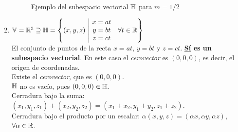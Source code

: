 \begin{enumerate}
\begin{figure}
        \caption{Ejemplo del subespacio vectorial $\mathbb{H}$ para $m=1/2$}
        \label{fig:ejemplo_de_subespacio_vectorial_1}
    \end{figure}

    \item $\mathbb{V} = \mathbb{R}^3 \supseteq \mathbb{H} = \left\{ (x,y,z) \ \middle| \ \begin{matrix} x = at \\ y = bt \\ z = ct \end{matrix} \quad \forall t \in \mathbb{R} \right\}$ \\ El conjunto de puntos de la recta $x = at$, $y = bt$ y $z = ct$. \textbf{\underline{Sí} es un subespacio vectorial}. En este caso el \textit{cerovector} es $(0, 0, 0)$, es decir, el origen de coordenadas.\\
        \checkmark Existe el \textit{cerovector}, que es $(0, 0, 0)$. \\
        \checkmark $\mathbb{H}$ no es vacío, pues $(0, 0, 0) \in \mathbb{H}$. \\
        \checkmark Cerradura bajo la suma: $(x_1, y_1, z_1) + (x_2, y_2, z_2) = (x_1 + x_2, y_1 + y_2, z_1 + z_2)$. \\
        \checkmark Cerradura bajo el producto por un escalar: $\alpha (x, y, z) = (\alpha x, \alpha y, \alpha z)$, $\forall \alpha \in \mathbb{R}$.


\end{enumerate}
